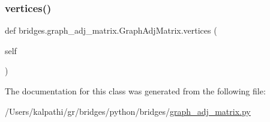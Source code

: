 \mbox{\label{classbridges_1_1graph__adj__matrix_1_1_graph_adj_matrix_a2f7f0fe4ba172afeb1dcb1afc1f6bf31}} 
\subsubsection{\texorpdfstring{vertices()}{vertices()}}
{\footnotesize\ttfamily def bridges.\+graph\+\_\+adj\+\_\+matrix.\+Graph\+Adj\+Matrix.\+vertices (\begin{DoxyParamCaption}\item[{}]{self }\end{DoxyParamCaption})}



The documentation for this class was generated from the following file\+:\begin{DoxyCompactItemize}
\item 
/\+Users/kalpathi/gr/bridges/python/bridges/\mbox{\hyperlink{graph__adj__matrix_8py}{graph\+\_\+adj\+\_\+matrix.\+py}}\end{DoxyCompactItemize}
